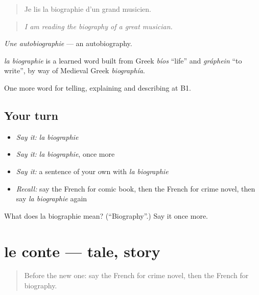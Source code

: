 \begin{quote}
Je lis la biographie d'un grand musicien.
\end{quote}

\begin{quote}
\emph{I am reading the biography of a great musician.}
\end{quote}

\emph{Une autobiographie} — an autobiography.

\begin{cousinweb}
\emph{la biographie} is a learned word built from Greek \emph{bíos} \textquotedblleft{}life\textquotedblright{} and \emph{gráphein} \textquotedblleft{}to write\textquotedblright{}, by way of Medieval Greek \emph{biographía}.
\end{cousinweb}

\begin{grammarlens}[title={What you've built}]
One more word for telling, explaining and describing at B1.
\end{grammarlens}

\subsection*{Your turn}
\begin{itemize}
\raggedright
  \item \emph{Say it:} \emph{la biographie}
  \item \emph{Say it:} \emph{la biographie}, once more
  \item \emph{Say it:} a sentence of your own with \emph{la biographie}
  \item \emph{Recall:} say the French for comic book, then the French for crime novel, then say \emph{la biographie} again
\end{itemize}

\begin{tcolorbox}[breakable,colback=teal!4,colframe=teal!35!black,title={Before you move on}]
What does la biographie mean? (\textquotedblleft{}Biography\textquotedblright{}.) Say it once more.
\end{tcolorbox}
\section[le conte]{le conte — tale, story}

\label{lesson:FR-C522-conte}



\begin{quote}
Before the new one: say the French for crime novel, then the French for biography.
\end{quote}

